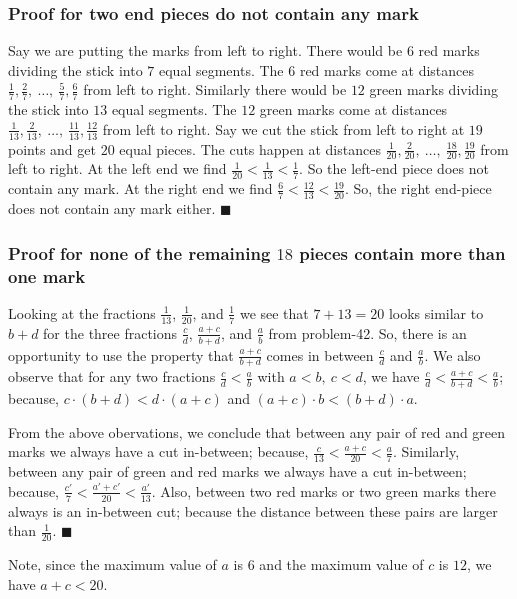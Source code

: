 \documentclass{article}
\begin{document}
\subsubsection{Proof for two end pieces do not contain any mark}
Say we are putting the marks from left to right. There would be $6$ red marks dividing the stick into $7$ equal segments. The $6$ red marks come at distances $\frac{1}{7}, \frac{2}{7},\ \ldots,\ \frac{5}{7}, \frac{6}{7}$ from left to right. Similarly there would be $12$ green marks dividing the stick into $13$ equal segments. The $12$ green marks come at distances $\frac{1}{13}, \frac{2}{13},\ \ldots,\ \frac{11}{13},\frac{12}{13}$ from left to right. Say we cut the stick from left to right at $19$ points and get $20$ equal pieces. The cuts happen at distances $\frac{1}{20}, \frac{2}{20},\ \ldots,\ \frac{18}{20}, \frac{19}{20}$ from left to right. At the left end we find $\frac{1}{20} < \frac{1}{13} < \frac{1}{7}$. So the left-end piece does not contain any mark. At the right end we find $\frac{6}{7} < \frac{12}{13} < \frac{19}{20}$. So, the right end-piece does not contain any mark either.  $\blacksquare$

\subsubsection{Proof for none of the remaining $18$ pieces contain more than one mark}
Looking at the fractions $\frac{1}{13}$, $\frac{1}{20}$, and $\frac{1}{7}$ we see that $7+13=20$ looks similar to $b+d$ for the three fractions $\frac{c}{d}$, $\frac{a+c}{b+d}$, and $\frac{a}{b}$ from problem-42. So, there is an opportunity to use the property that $\frac{a+c}{b+d}$ comes in between $\frac{c}{d}$ and $\frac{a}{b}$. We also observe that for any two fractions $\frac{c}{d} < \frac{a}{b}$ with $a < b,\ c < d$, we have $\frac{c}{d} < \frac{a+c}{b+d} < \frac{a}{b}$; because, $c \cdot (b+d) < d \cdot (a+c)$ and $(a+c) \cdot b < (b+d) \cdot a$.

From the above obervations, we conclude that between any pair of red and green marks we always have a cut in-between; because, $\frac{c}{13} < \frac{a+c}{20} < \frac{a}{7}$. Similarly, between any pair of green and red marks we always have a cut in-between; because, $\frac{c'}{7} < \frac{a'+c'}{20} < \frac{a'}{13}$. Also, between two red marks or two green marks there always is an in-between cut; because the distance between these pairs are larger than $\frac{1}{20}$.   $\blacksquare$

Note, since the maximum value of $a$ is $6$ and the maximum value of $c$ is $12$, we have $a+c < 20$.
\end{document}
